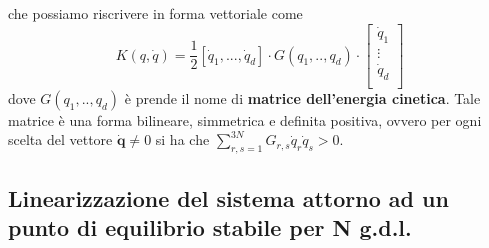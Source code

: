 che possiamo riscrivere in forma vettoriale come 
\begin{equation}
	K(q,\dot{q}) = \frac{1}{2} \left [ \dot{q}_1,...,\dot{q}_d\right] \cdot G(q_1,..,q_d) \cdot \left [  \begin{array}{c}
		\dot{q}_1 \\
		\vdots \\
		\dot{q}_d \\
	\end{array}\right] 
\end{equation}
dove $G(q_1,..,q_d)$ \`{e} prende il nome di \textbf{matrice dell'energia cinetica}. Tale matrice \`{e} una forma bilineare, simmetrica e definita positiva, ovvero per ogni scelta del vettore $\bm{\dot{q}} \neq 0$ si ha che $\sum_{r,s=1}^{3N}G_{r,s} \dot{q}_r \dot{q}_s > 0$.

\subsection{Linearizzazione del sistema attorno ad un punto di equilibrio stabile per N g.d.l.} 

